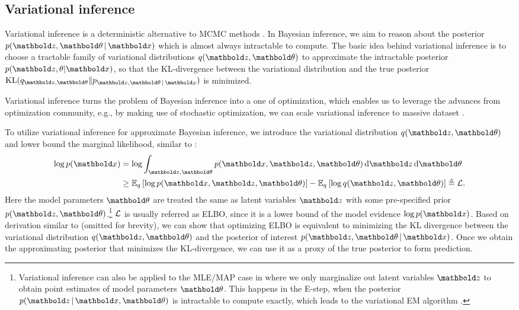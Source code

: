 \subsection{Variational inference}\label{chpt:background:sec:vi}

Variational inference is a deterministic alternative to \gls{MCMC} methods \citep{jordan1999introduction,wainwright2008graphical,blei2016variational}. In Bayesian inference, we aim to reason about the posterior $p(\mbz, \mb\theta \g \mbx)$ which is almost always intractable to compute. The basic idea behind variational inference is to choose a tractable family of variational distributions $q(\mbz, \mb\theta)$ to approximate the intractable posterior $p(\mbz, \theta | \mbx)$, so that the \gls{KL}-divergence between the variational distribution and the true posterior $\textrm{KL}(q_{\mbz, \mb\theta}\|p_{\mbz, \mb\theta \g \mbx})$ is minimized.

Variational inference turns the problem of Bayesian inference into a one of  optimization, which enables us to leverage the advances from optimization community, e.g., by making use of stochastic optimization, we can scale variational inference to massive dataset \citep{hoffman2013stochastic}.

To utilize variational inference for approximate Bayesian inference, we introduce the variational distribution $q(\mbz, \mb\theta)$ and lower bound the marginal likelihood, similar to :
\begin{equation}
\begin{split}
\log p(\mbx) &= \log\int_{\mbz, \mb\theta} p(\mbx, \mbz, \mb\theta) \dif{\mbz} \dif\mb\theta \\
&\geq \EE{q}{\log p(\mbx, \mbz, \mb\theta)} - \EE{q}{\log q(\mbz, \mb\theta)}\triangleq \cL.
\end{split}
\label{chpt:background:eq:vi}
\end{equation}
Here the model parameters $\mb\theta$ are treated the same as latent variables $\mbz$ with some pre-specified prior $p(\mbz, \mb\theta)$.\footnote{Variational inference can also be applied to the MLE/MAP case in  where we only marginalize out latent variables $\mbz$ to obtain point estimates of model parameters $\mb\theta$. This happens in the E-step, when the posterior $p(\mbz \g \mbx, \mb\theta)$ is intractable to compute exactly, which leads to the variational \gls{EM} algorithm \citep{beal2003variational}.} $\mathcal{L}$ is usually referred as \gls{ELBO}, since it is a lower bound of the model evidence $\log p(\mbx)$. Based on derivation similar to  (omitted for brevity), we can show that optimizing \gls{ELBO} is equivalent to minimizing the \gls{KL} divergence between the variational distribution $q(\mbz, \mb\theta)$ and the posterior of interest $p(\mbz, \mb\theta \g \mbx)$. Once we obtain the approximating posterior that minimizes the \gls{KL}-divergence, we can use it as a proxy of the true posterior to form prediction. 

